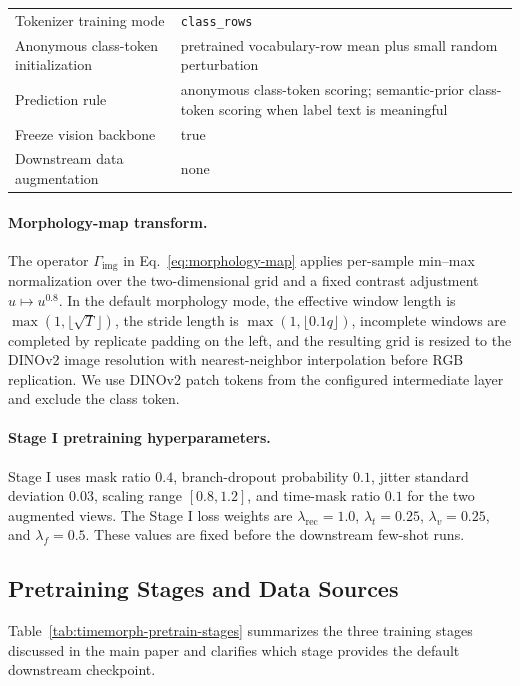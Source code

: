 \documentclass{article}
\begin{document}
\begin{table}[t]
{\begin{tabular}{ll}
Tokenizer training mode & \texttt{class\_rows} \\
Anonymous class-token initialization & pretrained vocabulary-row mean plus small random perturbation \\
Prediction rule & anonymous class-token scoring; semantic-prior class-token scoring when label text is meaningful \\
Freeze vision backbone & true \\
Downstream data augmentation & none \\
\bottomrule
\end{tabular}
}
\end{table}

\paragraph{Morphology-map transform.}
The operator $\Gamma_{\mathrm{img}}$ in Eq.~\ref{eq:morphology-map} applies per-sample min--max normalization over the two-dimensional grid and a fixed contrast adjustment $u\mapsto u^{0.8}$. In the default morphology mode, the effective window length is $\max(1,\lfloor\sqrt{T}\rfloor)$, the stride length is $\max(1,\lfloor 0.1q\rfloor)$, incomplete windows are completed by replicate padding on the left, and the resulting grid is resized to the DINOv2 image resolution with nearest-neighbor interpolation before RGB replication. We use DINOv2 patch tokens from the configured intermediate layer and exclude the class token.

\paragraph{Stage I pretraining hyperparameters.}
Stage I uses mask ratio $0.4$, branch-dropout probability $0.1$, jitter standard deviation $0.03$, scaling range $[0.8,1.2]$, and time-mask ratio $0.1$ for the two augmented views. The Stage I loss weights are $\lambda_{\mathrm{rec}}=1.0$, $\lambda_t=0.25$, $\lambda_v=0.25$, and $\lambda_f=0.5$. These values are fixed before the downstream few-shot runs.

\subsection{Pretraining Stages and Data Sources}
\label{app:pretrain-details}

Table~\ref{tab:timemorph-pretrain-stages} summarizes the three training stages discussed in the main paper and clarifies which stage provides the default downstream checkpoint.
\end{document}
